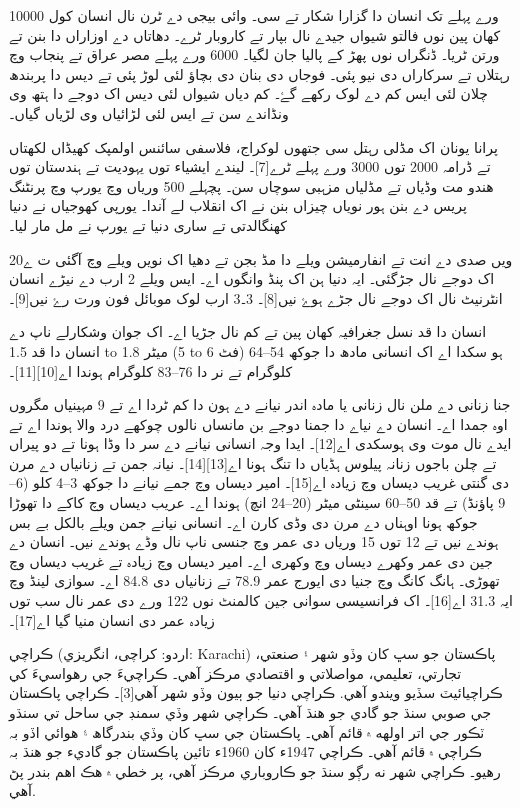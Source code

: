 \documentclass[a4paper]{article}
\begin{document}
\begin{flushright}
10000 ورے پہلے تک انسان دا گزارا شکار تے سی۔ وائی بیجی دے ٹرن نال انسان کول کھان پین نوں فالتو شیواں جیدے نال بپار تے کاروبار ٹرے۔ دھاتاں دے اوزاراں دا بنن تے ورتن ٹریا۔ ڈنگراں نوں پھڑ کے پالیا جان لگیا۔ 6000 ورے پہلے مصر عراق تے پنجاب وچ رہتلاں تے سرکاراں دی نیو پئی۔ فوجاں دی بنان دی بچاؤ لئی لوڑ پئی تے دیس دا پربندھ چلان لئی ایس کم دے لوک رکھے گۓ۔ کم دیاں شیواں لئی دیس اک دوجے دا ہتھ وی ونڈاندے سن تے ایس لئی لڑائیاں وی لڑیاں گیاں۔



پرانا یونان اک مڈلی رہتل سی جتھوں لوکراج، فلاسفی سائنس اولمپک کھیڈاں لکھتاں تے ڈرامہ 2000 توں 3000 ورے پہلے ٹرے[7]۔ لیندے ایشیاء توں یہودیت تے ہندستان توں ھندو مت وڈیاں تے مڈلیاں مزہبی سوچاں سن۔ پچہلے 500 وریاں وچ یورپ وچ پرنٹنگ پریس دے بنن ہور نویاں چیزاں بنن نے اک انقلاب لے آندا۔ یورپی کھوجیاں نے دنیا کھنگالدتی تے ساری دنیا تے یورپ نے مل مار لیا۔



20ویں صدی دے انت تے انفارمیشن ویلے دا مڈ بجن تے دھیا اک نویں ویلے وچ آگئی ت ے اک دوجے نال جڑگئی۔ ایہ دنیا ہن اک پنڈ وانگوں اے۔ ایس ویلے 2 ارب دے نیڑے انسان انٹرنیٹ نال اک دوجے نال جڑے ہوۓ نیں[8]۔ 3۔3 ارب لوک موبائل فون ورت رۓ نیں[9]۔

انسان دا قد نسل جغرافیہ کھان پین تے کم نال جڑیا اے۔ اک جوان وشکارلے ناپ دے انسان دا قد 1.5 to 1.8 میٹر (5 to 6 فٹ) ہو سکدا اے اک انسانی مادھ دا جوکھ 54–64 کلوگرام تے نر دا 76–83 کلوگرام ہوندا اے[10][11]۔



جنا زنانی دے ملن نال زنانی یا مادہ اندر نیانے دے ہون دا کم ٹردا اے تے 9 مہینیاں مگروں اوہ جمدا اے۔ انسان دے نیاے دا جمنا دوجے بن مانساں نالوں چوکھے درد والا ہوندا اے تے ایدے نال موت وی ہوسکدی اے[12]۔ ایدا وجہ انسانی نیانے دے سر دا وڈا ہونا تے دو پیراں تے چلن باجوں زنانہ پیلوس ہڈیاں دا تنگ ہونا اے[13][14]۔ نیانہ جمن تے زنانیاں دے مرن دی گنتی غریب دیساں وچ زیادہ اے[15]۔ امیر دیساں وچ جمے نیانے دا جوکھ 3–4 کلو (6–9 پاؤنڈ) تے قد 50–60 سینٹی میٹر (20–24 انچ) ہوندا اے۔ عریب دیساں وچ کاکے دا تھوڑا جوکھ ہونا اوہناں دے مرن دی وڈی کارن اے۔ انسانی نیانے جمن ویلے بالکل بے بس ہوندے نیں تے 12 توں 15 وریاں دی عمر وچ جنسی ناپ نال وڈے ہوندے نیں۔ انسان دے جین دی عمر وکھرے دیساں وچ وکھری اے۔ امیر دیساں وچ زیادہ تے غریب دیساں وچ تھوڑی۔ ہانگ کانگ وچ جنیا دی ایورج عمر 78.9 تے زنانیاں دی 84.8 اے۔ سوازی لینڈ وچ ایہ 31.3 اے[16]۔ اک فرانسیسی سوانی جین کالمنٹ نوں 122 ورے دی عمر نال سب توں زیادہ عمر دی انسان منیا گیا اے[17]۔

ڪراچي (اردو: کراچی، انگريزي: Karachi) پاڪستان جو سڀ کان وڏو شھر ۽ صنعتي، تجارتي، تعليمي، مواصلاتي و اقتصادي مرڪز آھي۔ ڪراچيءَ جي رهواسيءَ کي ڪراچيائيٽ سڏيو ويندو آهي. ڪراچي دنيا جو ٻيون وڏو شھر آھي[3]۔ ڪراچي پاڪستان جي صوبي سنڌ جو گادي جو ھنڌ آھي۔ ڪراچي شهر وڏي سمنڊ جي ساحل تي سنڌو ٽڪور جي اتر اولهه ۾ قائم آهي۔ پاڪستان جي سڀ کان وڏي بندرگاھ ۽ ھوائي اڏو بہ ڪراچي ۾ قائم آھي۔ ڪراچي 1947ء کان 1960ء تائين پاڪستان جو گاديء جو ھنڌ بہ رھيو۔ ڪراچي شهر نه رڳو سنڌ جو ڪاروباري مرڪز آهي، پر خطي ۾ هڪ اهم بندر پڻ آهي.


\end{flushright}
\end{document}
